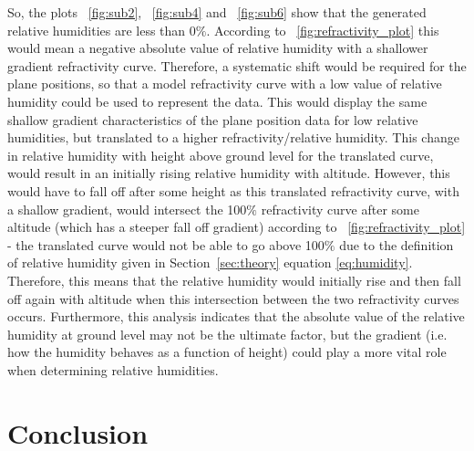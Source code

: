 \documentclass{article}
\newcommand{\figref}[2][\figurename~]{#1\ref{#2}}
\newcommand{\secref}[2][Section~]{#1\ref{#2}}
\begin{document}
\newpage
\vspace{2mm}
\noindent
So, the plots \figref{fig:sub2}, \figref{fig:sub4} and \figref{fig:sub6} show that the generated relative humidities are less than 0$\%$. According to \figref{fig:refractivity_plot} this would mean a negative absolute value of relative humidity with a shallower gradient refractivity curve. Therefore, a systematic shift would be required for the plane positions, so that a model refractivity curve with a low value of relative humidity could be used to represent the data. This would display the same shallow gradient characteristics of the plane position data for low relative humidities, but translated to a higher refractivity/relative humidity. This change in relative humidity with height above ground level for the translated curve, would result in an initially rising relative humidity with altitude. However, this would have to fall off after some height as this translated refractivity curve, with a shallow gradient, would intersect the 100$\%$ refractivity curve after some altitude (which has a steeper fall off gradient) according to \figref{fig:refractivity_plot} - the translated curve would not be able to go above 100$\%$ due to the definition of relative humidity given in \secref{sec:theory} equation \eqref{eq:humidity}. Therefore, this means that the relative humidity would initially rise and then fall off again with altitude when this intersection between the two refractivity curves occurs. Furthermore, this analysis indicates that the absolute value of the relative humidity at ground level may not be the ultimate factor, but the gradient (i.e. how the humidity behaves as a function of height) could play a more vital role when determining relative humidities.


\section{Conclusion}
\label{sec:conclusion}
\end{document}
